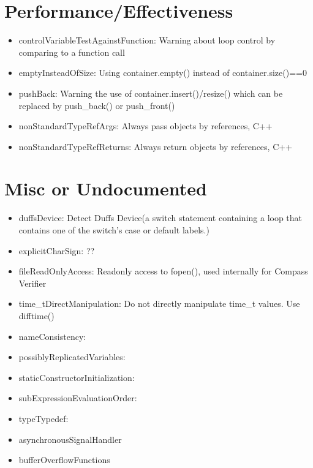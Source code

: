 \section{Performance/Effectiveness}
\begin{itemize}
\item controlVariableTestAgainstFunction: Warning about loop control by comparing to a function call
\item emptyInsteadOfSize: Using container.empty() instead of container.size()==0  
\item pushBack: Warning the use of container.insert()/resize() which can be
replaced by push\_back() or push\_front()
\item nonStandardTypeRefArgs: Always pass objects by references, C++
\item nonStandardTypeRefReturns: Always return objects by references, C++ 
\end{itemize}

\section{Misc or Undocumented}
\begin{itemize}
\item duffsDevice: Detect Duffs Device(a switch statement containing a loop that contains one of the switch's case or default labels.)
\item explicitCharSign: ??
\item fileReadOnlyAccess: Readonly access to fopen(), used internally for Compass Verifier
\item time\_tDirectManipulation: Do not directly manipulate time\_t values. Use difftime()
\item nameConsistency: 
\item possiblyReplicatedVariables: 
\item staticConstructorInitialization: 
\item subExpressionEvaluationOrder: 
\item typeTypedef: 
\item asynchronousSignalHandler
\item bufferOverflowFunctions
\end{itemize}
